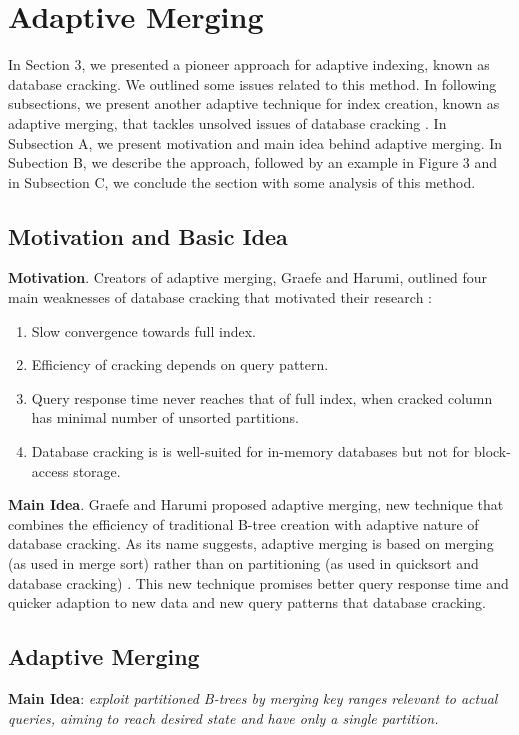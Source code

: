 \documentclass[10pt, conference, compsocconf]{IEEEtran}
\begin{document}
\section{Adaptive Merging}
In Section 3, we presented a pioneer approach for adaptive indexing, known as database cracking. We outlined some issues related to this method. In following subsections, we present another adaptive technique for index creation, known as adaptive merging, that tackles unsolved issues of database cracking \cite{merging}. In Subsection A, we present motivation and main idea behind adaptive merging. In Subection B, we describe the approach, followed by an example in Figure 3 and in Subsection C, we conclude the section with some analysis of this method.

\subsection{Motivation and Basic Idea}
\textbf{Motivation}. Creators of adaptive merging, Graefe and Harumi, outlined four main weaknesses of database cracking that motivated their research \cite{merging}:
\begin{enumerate}
\item{Slow convergence towards full index.}
\item{Efficiency of cracking depends on query pattern.}
\item{Query response time never reaches that of full index, when cracked column has minimal number of unsorted partitions.}
\item{Database cracking is is well-suited for in-memory databases but not for block-access storage.}
\end{enumerate}

\textbf{Main Idea}. Graefe and Harumi proposed adaptive merging, new technique that combines the efficiency of traditional B-tree creation with adaptive nature of database cracking. As its name suggests, adaptive merging is based on merging (as used in merge sort) rather than on partitioning (as used in quicksort and database cracking) \cite{merging}. This new technique promises better query response time and quicker adaption to new data and new query patterns that database cracking.

\subsection{Adaptive Merging}
\textbf{Main Idea}: \textit{exploit partitioned B-trees \cite{partitionedtrees} by merging key ranges relevant to actual queries, aiming to reach desired state and have only a single partition.}\\
\end{document}
